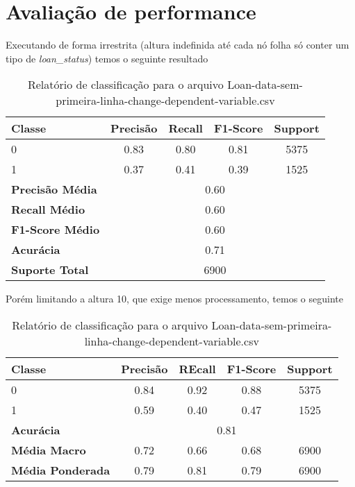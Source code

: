 \documentclass[12pt]{article}
\begin{document}
\section{Avaliação de performance}
Executando de forma irrestrita (altura indefinida até cada nó folha só conter um tipo de \textit{loan\_status}) temos o seguinte resultado
\begin{table}[h]
	\centering
	\begin{tabular}{lcccc}
		\hline
		\textbf{Classe} & \textbf{Precisão} & \textbf{Recall} & \textbf{F1-Score} & \textbf{Support} \\ \hline
		0                & 0.83              & 0.80               & 0.81               & 5375              \\
		1                & 0.37              & 0.41               & 0.39               & 1525              \\ \hline
		\textbf{Precisão Média} & \multicolumn{4}{c}{0.60} \\
		\textbf{Recall Médio} & \multicolumn{4}{c}{0.60} \\
		\textbf{F1-Score Médio} & \multicolumn{4}{c}{0.60} \\
		\textbf{Acurácia} & \multicolumn{4}{c}{0.71} \\
		\textbf{Suporte Total} & \multicolumn{4}{c}{6900} \\ \hline
	\end{tabular}
	\caption{Relatório de classificação para o arquivo Loan-data-sem-primeira-linha-change-dependent-variable.csv}
	\label{tab:class_report}
\end{table}

Porém limitando a altura 10, que exige menos processamento, temos o seguinte

\begin{table}[h]
	\centering
	\begin{tabular}{lcccc}
		\hline
		\textbf{Classe} & \textbf{Precisão} & \textbf{REcall} & \textbf{F1-Score} & \textbf{Support} \\ \hline
		0                & 0.84              & 0.92               & 0.88               & 5375              \\
		1                & 0.59              & 0.40               & 0.47               & 1525              \\ \hline
		\textbf{Acurácia} & \multicolumn{4}{c}{0.81} \\
		\textbf{Média Macro} & 0.72 & 0.66 & 0.68 & 6900 \\
		\textbf{Média Ponderada} & 0.79 & 0.81 & 0.79 & 6900 \\ \hline
	\end{tabular}
	\caption{Relatório de classificação para o arquivo Loan-data-sem-primeira-linha-change-dependent-variable.csv}
	\label{tab:class_report}
\end{table}
\end{document}
